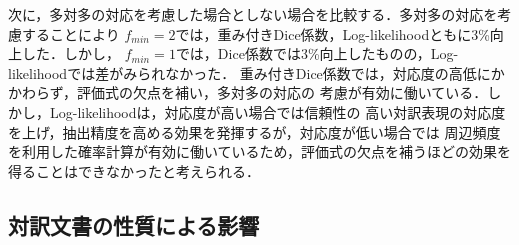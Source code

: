 次に，多対多の対応を考慮した場合としない場合を比較する．多対多の対応を考慮することにより
$f_{min}=2$では，重み付きDice係数，Log-likelihoodともに3\%向上した．しかし，
$f_{min}=1$では，Dice係数では3\%向上したものの，Log-likelihoodでは差がみられなかった．
重み付きDice係数では，対応度の高低にかかわらず，評価式の欠点を補い，多対多の対応の
考慮が有効に働いている．しかし，Log-likelihoodは，対応度が高い場合では信頼性の
高い対訳表現の対応度を上げ，抽出精度を高める効果を発揮するが，対応度が低い場合では
周辺頻度を利用した確率計算が有効に働いているため，評価式の欠点を補うほどの効果を
得ることはできなかったと考えられる．

\subsection{対訳文書の性質による影響}
\label{文書性質の実験}

